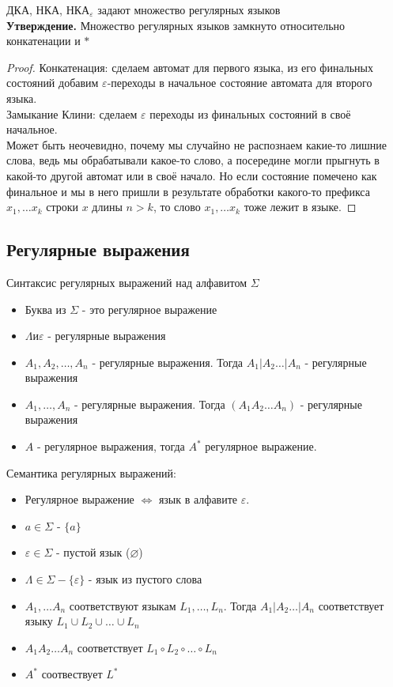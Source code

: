 ДКА, НКА, $\text{НКА}_\varepsilon$ задают множество регулярных языков\\

\textbf{Утверждение.} Множество регулярных языков замкнуто относительно конкатенации и $*$

\begin{proof}
    Конкатенация: сделаем автомат для первого языка, из его финальных состояний добавим $\varepsilon$-переходы в начальное состояние автомата для второго языка.\\
    Замыкание Клини: сделаем $\varepsilon$ переходы из финальных состояний в своё начальное.\\

    Может быть неочевидно, почему мы случайно не распознаем какие-то лишние слова, ведь мы обрабатывали какое-то слово, а посередине могли прыгнуть в какой-то другой автомат или в своё начало. Но если состояние помечено как финальное и мы в него пришли в результате обработки какого-то префикса $x_1, \dots x_k$ строки $x$ длины $n > k$, то слово $x_1, \dots x_k$ тоже лежит в языке.
\end{proof}

\subsection{Регулярные выражения}
\begin{conj}
    Синтаксис регулярных выражений над алфавитом $\Sigma$
    \begin{itemize}
        \item Буква из $\Sigma$ - это регулярное выражение
        \item $\Lambda и \varepsilon$ - регулярные выражения
        \item $A_1, A_2, \dots, A_n$ - регулярные выражения. Тогда $A_1 | A_2 \dots | A_n$ - регулярные выражения
        \item $A_1, \dots, A_n$ - регулярные выражения. Тогда $(A_1 A_2 \dots A_n)$ - регулярные выражения
        \item $A$ - регулярное выражения, тогда $A^*$ регулярное выражение.
    \end{itemize}

    Семантика регулярных выражений: 
    \begin{itemize}
        \item Регулярное выражение $\Leftrightarrow$ язык в алфавите $\varepsilon$.
        \item $a \in \Sigma$ - $\{a\}$
        \item $\varepsilon \in \Sigma$ - пустой язык ($\varnothing$)
        \item $\Lambda \in \Sigma - \{\varepsilon\}$ - язык из пустого слова 
        \item $A_1, \dots A_n$ соответствуют языкам $L_1, \dots, L_n$. Тогда $A_1 | A_2 \dots | A_n$ соответствует языку $L_1 \cup L_2 \cup \dots \cup L_n$
        \item $A_1 A_2 \dots A_n$ соответствует $L_1 \circ L_2 \circ \dots \circ L_n$
        \item $A^*$ соотвествует $L^*$
    \end{itemize}
\end{conj}


